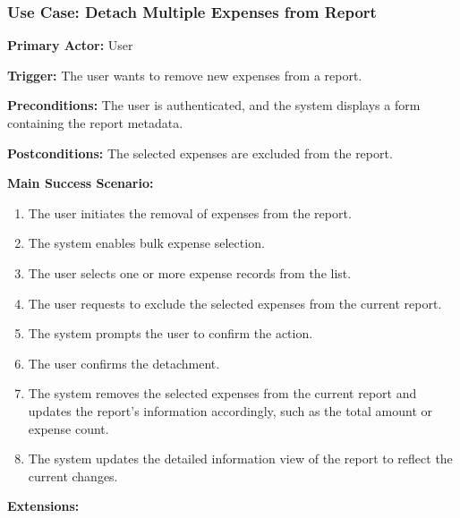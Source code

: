 \subsubsection{\textbf{Use Case: Detach Multiple Expenses from Report}}

\textbf{Primary Actor:} User

\textbf{Trigger:} The user wants to remove new expenses from a report.

\textbf{Preconditions:} The user is authenticated, and the system displays a form containing the report metadata.

\textbf{Postconditions:} The selected expenses are excluded from the report.

\vspace{4.5cm}

\textbf{Main Success Scenario:}

\begin{enumerate} [leftmargin=0.75cm, noitemsep]
\item The user initiates the removal of expenses from the report.
\item The system enables bulk expense selection.
\item The user selects one or more expense records from the list.
\item The user requests to exclude the selected expenses from the current report.
\item The system prompts the user to confirm the action.
\item The user confirms the detachment.
\item The system removes the selected expenses from the current report and updates the report’s information accordingly, such as the total amount or expense count.
\item The system updates the detailed information view of the report to reflect the current changes.
\end{enumerate}

\vspace{0.3cm}

\textbf{Extensions:}

